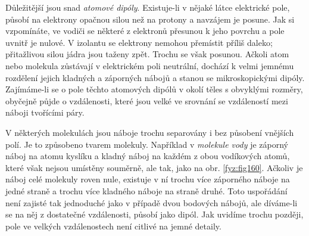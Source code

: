 {  Důležitější jsou snad \emph{atomové dipóly}. Existuje-li v nějaké látce elektrické pole, 
  působí na elektrony opačnou silou než na protony a navzájem je posune. Jak si vzpomínáte, ve 
  vodiči se některé z elektronů přesunou k jeho povrchu a pole uvnitř je nulové. V izolantu se 
  elektrony nemohou přemístit příliš daleko; přitažlivou silou jádra jsou taženy zpět. Trochu 
  se však posunou. Ačkoli atom nebo molekula zůstávají v elektrickém poli neutrální, dochází k 
  velmi jemnému rozdělení jejich kladných a záporných nábojů a stanou se mikroskopickými 
  dipóly. Zajímáme-li se o pole těchto atomových dipólů v okolí těles s obvyklými rozměry, 
  obyčejně půjde o vzdálenosti, které jsou velké ve srovnání se vzdáleností mezi náboji 
  tvořícími páry.
  
  V některých molekulách jsou náboje trochu separovány i bez působení vnějších polí. Je to 
  způsobeno tvarem molekuly. Například v \emph{molekule vody} je záporný náboj na atomu kyslíku 
  a kladný náboj na každém z obou vodíkových atomů, které však nejsou umístěny souměrně, ale 
  tak, jako na obr. \ref{fyz:fig160}. Ačkoliv je náboj celé molekuly roven nule, existuje v ní 
  trochu více záporného náboje na jedné straně a trochu více kladného náboje na straně druhé. 
  Toto uspořádání není zajisté tak jednoduché jako v případě dvou bodových nábojů, ale 
  díváme-li se na něj z dostatečné vzdálenosti, působí jako dipól. Jak uvidíme trochu později, 
  pole ve velkých vzdálenostech není citlivé na jemné detaily.

}
